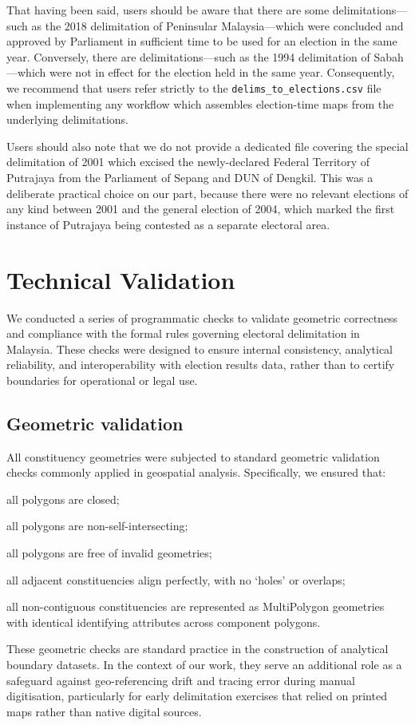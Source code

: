\documentclass[11pt]{article}
\begin{document}
That having been said, users should be aware that there are some delimitations---such as the 2018 delimitation of Peninsular Malaysia---which were concluded and approved by Parliament in sufficient time to be used for an election in the same year. Conversely, there are delimitations---such as the 1994 delimitation of Sabah---which were not in effect for the election held in the same year. Consequently, we recommend that users refer strictly to the \texttt{delims\_to\_elections.csv} file when implementing any workflow which assembles election-time maps from the underlying delimitations.

Users should also note that we do not provide a dedicated file covering the special delimitation of 2001 which excised the newly-declared Federal Territory of Putrajaya from the Parliament of Sepang and DUN of Dengkil. This was a deliberate practical choice on our part, because there were no relevant elections of any kind between 2001 and the general election of 2004, which marked the first instance of Putrajaya being contested as a separate electoral area.

\section*{Technical Validation}

We conducted a series of programmatic checks to validate geometric correctness and compliance with the formal rules governing electoral delimitation in Malaysia. These checks were designed to ensure internal consistency, analytical reliability, and interoperability with election results data, rather than to certify boundaries for operational or legal use.

\subsection*{Geometric validation}

All constituency geometries were subjected to standard geometric validation checks commonly applied in geospatial analysis. Specifically, we ensured that:
\begin{enumbul}
	\item all polygons are closed;
	\item all polygons are non-self-intersecting;
	\item all polygons are free of invalid geometries;
	\item all adjacent constituencies align perfectly, with no `holes' or overlaps;
	\item all non-contiguous constituencies are represented as MultiPolygon geometries with identical identifying attributes across component polygons.
\end{enumbul}
These geometric checks are standard practice in the construction of analytical boundary datasets. In the context of our work, they serve an additional role as a safeguard against geo-referencing drift and tracing error during manual digitisation, particularly for early delimitation exercises that relied on printed maps rather than native digital sources.
\end{document}
